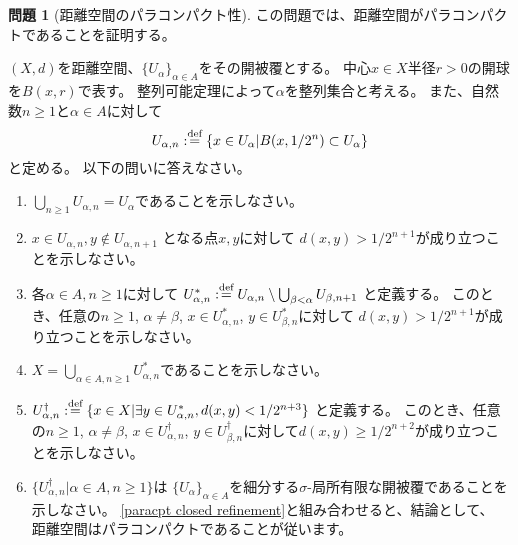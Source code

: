 \documentclass[uplatex]{jsarticle}
\theoremstyle{definition}
\newtheorem{prob}[prob]{問題}
\newcommand{\dfn}{:\overset{\mbox{{\scriptsize def}}}{=}}
\begin{document}
\begin{prob}[距離空間のパラコンパクト性]
  この問題では、距離空間がパラコンパクトであることを証明する。

  \((X,d)\)を距離空間、\(\{U_{\alpha}\}_{\alpha\in A}\)をその開被覆とする。
  中心\(x\in X\)半径\(r>0\)の開球を\(B(x,r)\)で表す。
  整列可能定理によって\(\alpha\)を整列集合と考える。
  また、自然数\(n \geq 1\)と\(\alpha\in A\)に対して
  \[
  U_{\alpha,n}\dfn \{x\in U_{\alpha} | B(x,1/2^n)\subset U_{\alpha}\}
  \]
  と定める。
  以下の問いに答えなさい。
  \begin{enumerate}
    \item
    \(\bigcup_{n\geq 1} U_{\alpha,n} = U_{\alpha}\)であることを示しなさい。
    \item
    \(x\in U_{\alpha,n}, y\not\in U_{\alpha,n+1}\)
    となる点\(x,y\)に対して
    \(d(x,y) > 1/2^{n+1}\)が成り立つことを示しなさい。
    \item
    各\(\alpha\in A, n \geq 1\)に対して
    \(U_{\alpha,n}^*\dfn U_{\alpha,n}\setminus \bigcup_{\beta < \alpha}U_{\beta,n+1}\)
    と定義する。
    このとき、任意の\(n\geq 1\),
    \(\alpha\neq \beta\),
    \(x\in U_{\alpha,n}^*\),
    \(y\in U_{\beta,n}^*\)に対して
    \(d(x,y) > 1/2^{n+1}\)が成り立つことを示しなさい。
    \item
    \(X = \bigcup_{\alpha\in A,n\geq 1}U_{\alpha,n}^*\)であることを示しなさい。
    \item
    \(U_{\alpha,n}^{\dagger}\dfn \{x\in X|\exists y\in U_{\alpha,n}^*, d(x,y) < 1/2^{n+3}\}\)
    と定義する。
    このとき、任意の\(n\geq 1\),
    \(\alpha\neq \beta\),
    \(x\in U_{\alpha,n}^{\dagger}\),
    \(y\in U_{\beta,n}^{\dagger}\)に対して\(d(x,y) \geq 1/2^{n+2}\)が成り立つことを示しなさい。
    \item
    \(\{U_{\alpha,n}^{\dagger}|\alpha\in A,n\geq 1\}\)は
    \(\{U_{\alpha}\}_{\alpha\in A}\)を細分する\(\sigma\)-局所有限な開被覆であることを示しなさい。
    \autoref{paracpt closed refinement}と組み合わせると、結論として、
    距離空間はパラコンパクトであることが従います。
  \end{enumerate}
\end{prob}
\end{document}
